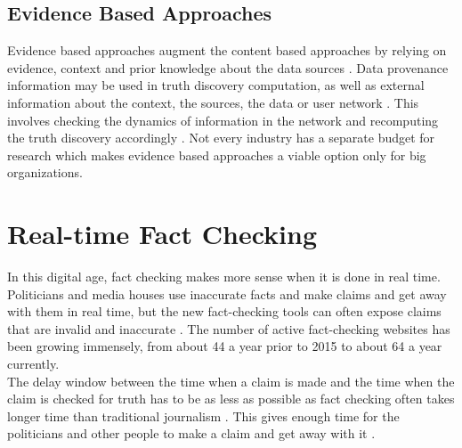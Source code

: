 \documentclass[sigconf]{acmart}
\begin{document}
\subsection{Evidence Based Approaches}
Evidence based approaches augment the content based approaches by relying on evidence, context and prior knowledge about the data sources \cite{Berti-Equille2016}. Data provenance information may be used in truth discovery computation, as well as external information about the context, the sources, the data or user network \cite{Berti-Equille2016}. This involves checking the dynamics of information in the network and recomputing the truth discovery accordingly \cite{Berti-Equille2016}. Not every industry has a separate budget for research which makes evidence based approaches a viable option only for big organizations.

\section{Real-time Fact Checking}
In this digital age, fact checking makes more sense when it is done in real time. Politicians and media houses use inaccurate facts and make claims and get away with them in real time, but the new fact-checking tools can often expose claims that are invalid and inaccurate \cite{Hassan2015}.  The number of active fact-checking websites has been growing immensely, from about 44 a year prior to 2015 to about 64 a year currently\cite{Hassan2015}. \\
The delay window between the time when a claim is made and the time when the claim is checked for truth has to be as less as possible as fact checking often takes longer time than traditional journalism \cite{Hassan2015}. This gives enough time for the politicians and other people to make a claim and get away with it \cite{Hassan2015}.
\end{document}
